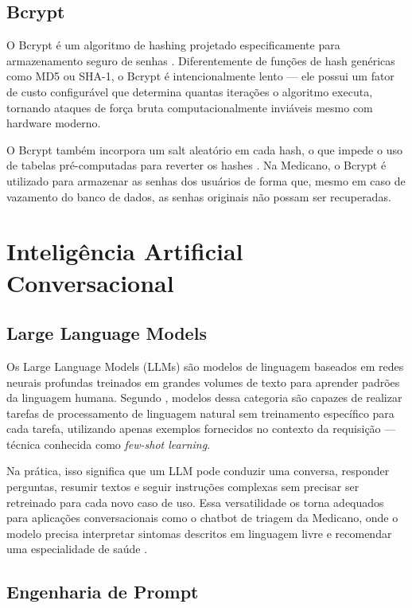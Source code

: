 \subsection{Bcrypt}
\label{subsec:bcrypt}

O Bcrypt é um algoritmo de hashing projetado
especificamente para armazenamento seguro de senhas
\cite{provos1999}. Diferentemente de funções de hash
genéricas como MD5 ou SHA-1, o Bcrypt é intencionalmente
lento — ele possui um fator de custo configurável que
determina quantas iterações o algoritmo executa, tornando
ataques de força bruta computacionalmente inviáveis mesmo
com hardware moderno.

O Bcrypt também incorpora um salt aleatório em cada hash,
o que impede o uso de tabelas pré-computadas para reverter
os hashes \cite{provos1999}. Na Medicano, o Bcrypt é
utilizado para armazenar as senhas dos usuários de forma
que, mesmo em caso de vazamento do banco de dados, as
senhas originais não possam ser recuperadas.

\section{Inteligência Artificial Conversacional}
\label{sec:conversational-ai}

\subsection{Large Language Models}
\label{subsec:llm}

Os Large Language Models (LLMs) são modelos de linguagem
baseados em redes neurais profundas treinados em grandes
volumes de texto para aprender padrões da linguagem humana.
Segundo , modelos dessa categoria
são capazes de realizar tarefas de processamento de
linguagem natural sem treinamento específico para cada
tarefa, utilizando apenas exemplos fornecidos no contexto
da requisição — técnica conhecida como
\textit{few-shot learning}.

Na prática, isso significa que um LLM pode conduzir uma
conversa, responder perguntas, resumir textos e seguir
instruções complexas sem precisar ser retreinado para
cada novo caso de uso. Essa versatilidade os torna
adequados para aplicações conversacionais como o chatbot
de triagem da Medicano, onde o modelo precisa interpretar
sintomas descritos em linguagem livre e recomendar uma
especialidade de saúde \cite{brown2020}.

\subsection{Engenharia de Prompt}
\label{subsec:prompt-engineering}

